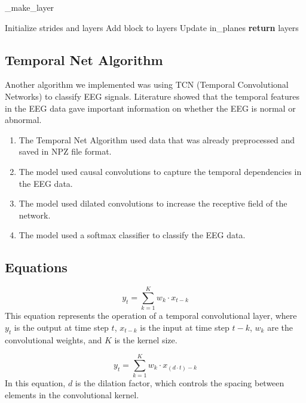 \documentclass[10pt]{article}
\begin{document}
\begin{algorithm}[H]
  \caption{\_make\_layer}
  \begin{algorithmic}[3]
      \State Initialize strides and layers
      \State
        \State Add block to layers
        \State Update in\_planes
      \EndFor
      \State
      \State \textbf{return} layers
    \EndProcedure
  \end{algorithmic}
\end{algorithm}


\subsection{Temporal Net Algorithm}
Another algorithm we implemented was using TCN (Temporal Convolutional Networks) to classify EEG signals. Literature showed that the temporal features in the EEG data gave important information on whether the EEG is normal or abnormal.

\begin{enumerate}
    \item The Temporal Net Algorithm used data that was already preprocessed and saved in NPZ file format.
    \item The model used causal convolutions to capture the temporal dependencies in the EEG data.
    \item The model used dilated convolutions to increase the receptive field of the network.
    \item The model used a softmax classifier to classify the EEG data.
\end{enumerate}

\subsection{Equations}
\[
y_t = \sum_{k=1}^{K} w_k \cdot x_{t-k}
\]
This equation represents the operation of a temporal convolutional layer, where \( y_t \) is the output at time step \( t \), \( x_{t-k} \) is the input at time step \( t-k \), \( w_k \) are the convolutional weights, and \( K \) is the kernel size.

\[
y_t = \sum_{k=1}^{K} w_k \cdot x_{(d \cdot t) - k}
\]
In this equation, \( d \) is the dilation factor, which controls the spacing between elements in the convolutional kernel.
\end{document}
